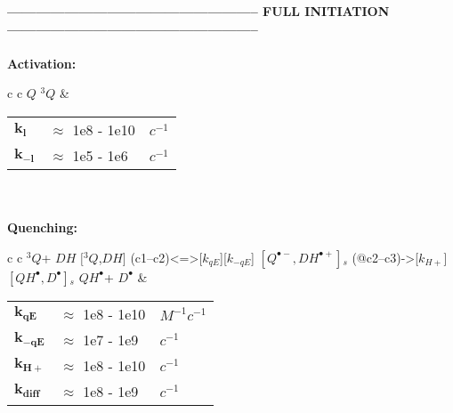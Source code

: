 \documentclass{article}
\def\IRP{$\left[Q^{\bullet -},DH^{\bullet +}\right]{}_s$}
\def\QH{$QH^{\bullet }$}
\def\D{$D^{\bullet }$}
\def\Q{$Q$}
\def\Qt{$^{3}Q$}
\def\DH{$DH$}
\begin{document}
\vspace{1.5mm}
\vspace{1.5mm}


\newpage
\textbf{----------------------------------------------------- FULL INITIATION -----------------------------------------------------}
\\
\\
\textbf{Activation:}
\begin{tabular}{ c c }
    \schemestart
    \Q
    \arrow{<=>[$h\nu$, $k_l$][$k_{-l}$]}
    \Qt
    \schemestop
     & \begin{tabular}{ l l l }
           $\mathbf{k_l}$    & $\approx$ 1e8 - 1e10 & $c^{-1}$ \\
           $\mathbf{k_{-l}}$ & $\approx$ 1e5  - 1e6 & $c^{-1}$ \\\hline
       \end{tabular}
    \vspace{1.5mm}
\end{tabular}
\vspace{1.5mm}
\\
\\
\textbf{Quenching:}

\begin{tabular}{ c c }
    \schemestart
    \Qt + \DH
    \arrow{->[$k_{diff}$]}
    $[$\Qt,\DH$]$
    \arrow(c1--c2){<=>[$k_{qE}$][$k_{-qE}$]}
    \IRP
    \arrow(@c2--c3){->[$k_{H+}$]}
    $\left[QH^{\bullet},D^{\bullet}\right]{}_s$
    \arrow{->[$k_{diff}$]}
    \QH + \D
    \schemestop
     & \begin{tabular}{ l l l }
           $\mathbf{k_{qE}}$   & $\approx$ 1e8 - 1e10 & $M^{-1}c^{-1}$ \\
           $\mathbf{k_{-qE}}$  & $\approx$ 1e7 - 1e9  & $c^{-1}$       \\
           $\mathbf{k_{H+}}$   & $\approx$ 1e8 - 1e10 & $c^{-1}$       \\
           $\mathbf{k_{diff}}$ & $\approx$ 1e8 - 1e9  & $c^{-1}$       \\\hline
       \end{tabular}
    \vspace{1.5mm}
    \\
\end{tabular}
\vspace{1.5mm}
\end{document}
